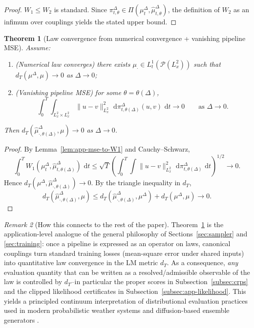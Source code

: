 \documentclass{article}
\numberwithin{equation}{section}
\theoremstyle{plain}
\newtheorem{theorem}{Theorem}[section]
\theoremstyle{definition}
\theoremstyle{remark}
\newtheorem{remark}[theorem]{Remark}
\newcommand{\Pcal}{\mathcal{P}}
\newcommand{\dd}{\,\mathrm{d}}
\begin{document}
\begin{proof}
$W_1\le W_2$ is standard. Since $\pi^\Delta_{t,\theta}\in\Pi(\mu_t^\Delta,\widehat\mu^\Delta_{t,\theta})$, the definition of $W_2$
as an infimum over couplings yields the stated upper bound.
\end{proof}

\begin{theorem}[Law convergence from numerical convergence + vanishing pipeline MSE]
\label{thm:app-law-conv}
Assume:
\begin{enumerate}[label=(\roman*),leftmargin=2.2em]
\item (\emph{Numerical law converges}) there exists $\mu_\cdot\in L^1_t(\Pcal(L^2_x))$ such that
$d_T(\mu^\Delta,\mu)\to 0$ as $\Delta\to0$;
\item (\emph{Vanishing pipeline MSE}) for some $\theta=\theta(\Delta)$,
\[
\int_0^T\int_{L^2_x\times L^2_x}\|u-v\|_{L^2_x}^2\,\dd\pi^\Delta_{t,\theta(\Delta)}(u,v)\,\dd t \to 0
\qquad\text{as }\Delta\to 0.
\]
\end{enumerate}
Then $d_T(\widehat\mu^\Delta_{\cdot,\theta(\Delta)},\mu)\to0$ as $\Delta\to0$.
\end{theorem}

\begin{proof}
By Lemma~\ref{lem:app-mse-to-W1} and Cauchy--Schwarz,
\[
\int_0^T W_1(\mu_t^\Delta,\widehat\mu^\Delta_{t,\theta(\Delta)})\,\dd t
\le \sqrt{T}\left(\int_0^T\int\|u-v\|_{L^2_x}^2\,\dd\pi^\Delta_{t,\theta(\Delta)}\,\dd t\right)^{1/2}\to0.
\]
Hence $d_T(\mu^\Delta,\widehat\mu^\Delta_{\cdot,\theta(\Delta)})\to0$. By the triangle inequality in $d_T$,
\[
d_T(\widehat\mu^\Delta_{\cdot,\theta(\Delta)},\mu)\le
d_T(\widehat\mu^\Delta_{\cdot,\theta(\Delta)},\mu^\Delta)+d_T(\mu^\Delta,\mu)\to0.
\]
\end{proof}

\begin{remark}[How this connects to the rest of the paper]
Theorem~\ref{thm:app-law-conv} is the application-level analogue of the general philosophy of Sections~\ref{sec:sampler} and
\ref{sec:training}: once a pipeline is expressed as an operator on laws, canonical couplings turn standard training losses
(mean-square error under shared inputs) into quantitative law convergence in the LM metric $d_T$.
As a consequence, \emph{any} evaluation quantity that can be written as a resolved/admissible observable of the law is
controlled by $d_T$--in particular the proper scores in Subsection~\ref{subsec:crps} and the clipped likelihood certificates
in Subsection~\ref{subsec:app-likelihood}.
This yields a principled continuum interpretation of distributional evaluation practices used in modern probabilistic weather
systems and diffusion-based ensemble generators \cite{price2023gencast,price2025probabilistic,lang2026aifs,larsson2025diffusion,mahesh2024huge,mahesh2024huge2}.
\end{remark}
\end{document}
